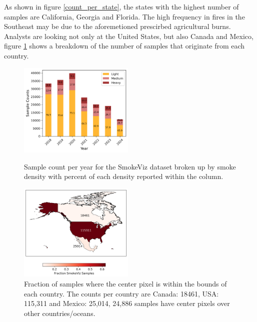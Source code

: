 \documentclass{article}
\begin{document}
As shown in figure \ref{count_per_state}, the states with the highest number of samples are California, Georgia and Florida. The high frequency in fires in the Southeast may be due to the aforemetioned prescirbed agricultural burns. Analysts are looking not only at the United States, but also Canada and Mexico, figure \ref{count_per_country} shows a breakdown of the number of samples that originate from each country.


\begin{figure}[!htb]
    \parbox{\textwidth}{
      \parbox{0.49\textwidth}{
        \centering
        \includegraphics[width=0.49\textwidth]{stat_figs/sample_count_per_yr_percentages.png}
        \caption{Sample count per year for the SmokeViz dataset broken up by smoke density with percent of each density reported within the column.}
        \label{count_per_yr}
      }
    \hspace{0.01\textwidth}
      \parbox{0.49\textwidth}{
        \centering
        \includegraphics[width=0.49\textwidth]{stat_figs/sample_percent_country.png}
        \caption{Fraction of samples where the center pixel is within the bounds of each country. The counts per country are Canada: 18461, USA: 115,311 and Mexico: 25,014, 24,886 samples have center pixels over other countries/oceans.}
        \label{count_per_country}
      }
    }
\end{figure}
\end{document}
